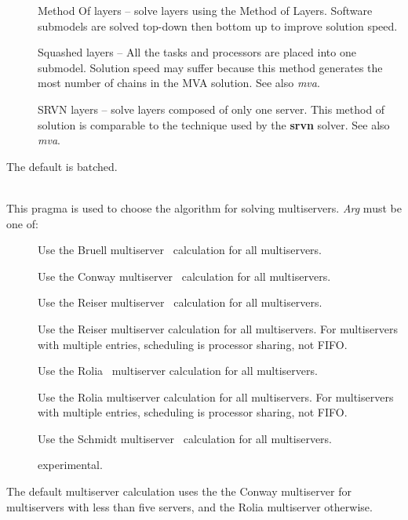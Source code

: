 \begin{description}
\begin{description}
\item[]
Method Of layers -- solve layers using the Method of Layers.  Software submodels are solved top-down then bottom up to improve solution speed.
\item[]
Squashed layers -- All the tasks and processors are placed into one submodel.
Solution speed may suffer because this method generates the most number of chains in the MVA solution.  See also \emph{mva}.
\item[]
SRVN layers -- solve layers composed of only one server.
This method of solution is comparable to the technique used by the \textbf{srvn} solver.  See also \emph{mva}.
\end{description}
The default is batched.
\item[\optarg{multiserver}{=\emph{arg}}]~\\
This pragma is used to choose the algorithm for solving multiservers.
\emph{Arg} must be one of: 
\begin{description}
\item[]
Use the Bruell multiserver~\cite{queue:bruell-84-peva-load-dependent} calculation for all multiservers.
\item[]
Use the Conway multiserver~\cite{queue:deSouzaeSilva-87,queue:conway-88} calculation for all multiservers.
\item[]
Use the Reiser multiserver~\cite{queue:reiser-79} calculation for all multiservers.
\item[]
Use the Reiser multiserver calculation for all multiservers. For multiservers with multiple entries, scheduling is processor sharing, not FIFO. 
\item[]
Use the Rolia~\cite{perf:rolia-92,perf:rolia-95-ieeese-mol} multiserver calculation for all multiservers.
\item[]
Use the Rolia multiserver calculation for all multiservers. For multiservers with multiple entries, scheduling is processor sharing, not FIFO. 
\item[]
Use the Schmidt multiserver~\cite{queue:schmidt-97} calculation for all multiservers.
\item[]
experimental.
\end{description}
The default multiserver calculation uses the the Conway multiserver for multiservers with less than five servers, and the Rolia multiserver otherwise.


\end{description}
